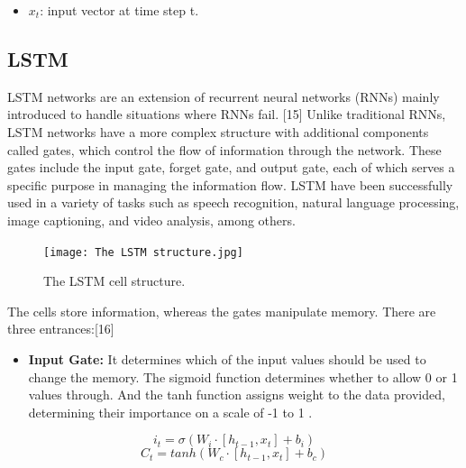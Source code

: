 \documentclass{ieeeojies}
\begin{document}
\begin{itemize}
    \item\(x_t\): input vector at time step t.
\end{itemize}


\subsection{LSTM}
LSTM networks are an extension of recurrent neural networks (RNNs) mainly introduced to handle situations where RNNs fail. [15] Unlike traditional RNNs, LSTM networks have a more complex structure with additional components called gates, which control the flow of information through the network. These gates include the input gate, forget gate, and output gate, each of which serves a specific purpose in managing the information flow. LSTM have been successfully used in a variety of tasks such as speech recognition, natural language processing, image captioning, and video analysis, among others. 
 \begin{figure}[H]
    \centering
    \begin{minipage}{0.50\textwidth}
    \centering
    \texttt{[image: The LSTM structure.jpg]}
    \caption{The LSTM cell structure.}
    \label{fig:1}
    \end{minipage}
\end{figure}
The cells store information, whereas the gates manipulate memory. There are three entrances:[16]
\begin{itemize}
    \item  \textbf{Input Gate:}  It determines which of the input values should be used to change the memory. The sigmoid function determines whether to allow 0 or 1 values through. And the tanh function assigns weight to the data provided, determining their importance on a scale of -1 to 1 . 
\end{itemize}
\[i_t = \sigma(W_i \cdot [h_{t-1}, x_t] + b_i)\]
\[C_t = tanh(W_c \cdot [h_{t-1}, x_t] + b_c)\]
\end{document}
